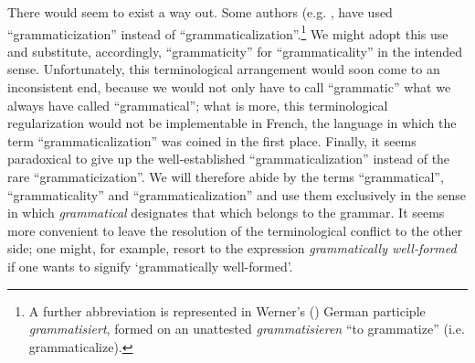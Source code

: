\label{page11}There would seem to exist a way out. Some authors (e.g. \citet[49]{Givón1975}, \citet[489]{Bolinger1978} have used ``grammaticization'' instead of ``grammaticalization''.\footnote{A further abbreviation is represented in Werner's (\citeyear[965f]{Werner1979}) German participle \textit{grammatisiert}, formed on an unattested \textit{grammatisieren} “to grammatize” (i.e. grammaticalize).} We might adopt this use and substitute, accordingly, ``grammaticity'' for ``grammaticality'' in the intended sense. Unfortunately, this terminological arrangement would soon come to an inconsistent end, because we would not only have to call ``grammatic'' what we always have called ``grammatical''; what is more, this terminological regularization would not be implementable in French, the language in which the term ``grammaticalization'' was coined in the first place. Finally, it seems paradoxical to give up the well-established ``grammaticalization'' instead of the rare ``grammaticization''. We will therefore abide by the terms ``grammatical'', ``grammaticality'' and ``grammaticalization'' and use them exclusively in the sense in which \textit{grammatical} designates that which belongs to the grammar. It seems more convenient to leave the resolution of the terminological conflict to the other side; one might, for example, resort to the expression \textit{grammatically well-formed} if one wants to signify `grammatically well-formed'.

